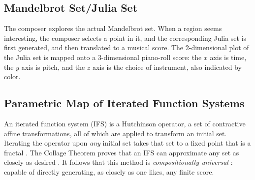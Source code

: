 \documentclass[11pt,papersize=a4]{scrartcl}
\begin{document}
\subsection*{Mandelbrot Set/Julia Set}

The composer explores the actual Mandelbrot set. When a region seems interesting, the composer selects a point in it, and the corresponding Julia set is first generated, and then translated to a musical score. The 2-dimensional plot of the Julia set is mapped onto a 3-dimensional piano-roll score: the $x$ axis is time, the $y$ axis is pitch, and the $z$ axis is the choice of instrument, also indicated by color.

\subsection*{Parametric Map of Iterated Function Systems}

An iterated function system (IFS) is a Hutchinson operator, a set of contractive affine transformations, all of which are applied to transform an initial set. Iterating the operator upon \emph{any} initial set takes that set to a fixed point that is a fractal \parencite{barnsley1985iterated, barnsley1993}. The Collage Theorem proves that an IFS can approximate any set as closely as desired \parencite{barnsley1989fractal, barnsley1993}. It follows that this method is \emph{compositionally universal} \parencite{obsessed, gogins2023scoregraphs}: capable of directly generating, as closely as one likes, any finite score. 
\end{document}
